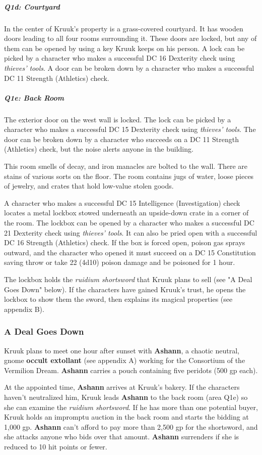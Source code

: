 \documentclass[10pt,a4paper,twoside,fancy,bg=print,twocolumn,openany,nodeprecatedcode]{dndbook}
\begin{document}
\subparagraph{Q1d: Courtyard}
In the center of Kruuk's property is a grass-covered courtyard. It has wooden doors leading to all four rooms surrounding it. These doors are locked, but any of them can be opened by using a key Kruuk keeps on his person. A lock can be picked by a character who makes a successful DC 16 Dexterity check using \textit{thieves' tools}. A door can be broken down by a character who makes a successful DC 11 Strength (Athletics) check.

\subparagraph{Q1e: Back Room}
The exterior door on the west wall is locked. The lock can be picked by a character who makes a successful DC 15 Dexterity check using \textit{thieves' tools}. The door can be broken down by a character who succeeds on a DC 11 Strength (Athletics) check, but the noise alerts anyone in the building.

This room smells of decay, and iron manacles are bolted to the wall. There are stains of various sorts on the floor. The room contains jugs of water, loose pieces of jewelry, and crates that hold low-value stolen goods.

A character who makes a successful DC 15 Intelligence (Investigation) check locates a metal lockbox stowed underneath an upside-down crate in a corner of the room. The lockbox can be opened by a character who makes a successful DC 21 Dexterity check using \textit{thieves' tools}. It can also be pried open with a successful DC 16 Strength (Athletics) check. If the box is forced open, poison gas sprays outward, and the character who opened it must succeed on a DC 15 Constitution saving throw or take 22 (4d10) poison damage and be poisoned for 1 hour.

The lockbox holds the \textit{ruidium shortsword} that Kruuk plans to sell (see "A Deal Goes Down" below). If the characters have gained Kruuk's trust, he opens the lockbox to show them the sword, then explains its magical properties (see appendix B).

\subsubsection{A Deal Goes Down}
Kruuk plans to meet one hour after sunset with \textbf{Ashann}, a chaotic neutral, gnome \textbf{occult extollant} (see appendix A) working for the Consortium of the Vermilion Dream. \textbf{Ashann} carries a pouch containing five peridots (500 gp each).

At the appointed time, \textbf{Ashann} arrives at Kruuk's bakery. If the characters haven't neutralized him, Kruuk leads \textbf{Ashann} to the back room (area Q1e) so she can examine the \textit{ruidium shortsword}. If he has more than one potential buyer, Kruuk holds an impromptu auction in the back room and starts the bidding at 1,000 gp. \textbf{Ashann} can't afford to pay more than 2,500 gp for the shortsword, and she attacks anyone who bids over that amount. \textbf{Ashann} surrenders if she is reduced to 10 hit points or fewer.
\end{document}
